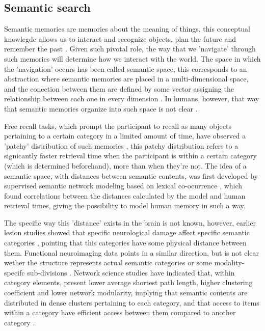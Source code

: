 \documentclass[11pt]{article}
\begin{document}
\subsection{Semantic search}
\label{sec:org3baebef}

Semantic memories are memories about the meaning of things, this conceptual
knowlegde allows us to interact and recognize objects, plan the future and
remember the past \citep{binderNeurobiologySemanticMemory2011}. Given such pivotal
role, the way that we 'navigate' through such memories will determine how we
interact with the world. The space in which the 'navigation' occurs has been
called semantic space, this corresponds to an abstraction where semantic
memories are placed in a multi-dimensional space, and the conection between them
are defined by some vector assigning the relationship between each one in every
dimension \citep{lundProducingHighdimensionalSemantic1996a}. In humans, however,
that way that semantic memories organize into such space is not clear
\citep{benedekHowSemanticMemory2017}.  

Free recall tasks, which prompt the participant to recall as many objects
pertaining to a certain category in a limited amount of time, have observed a
'patchy' distribution of such memories \citep{hillsOptimalForagingSemantic2009},
this patchy distribution refers to a signicantly faster retrieval time when the
participant is within a certain category (which is determined beforehand), more
than when they're not. The idea of a semantic space, with distances between
semantic contents, was first developed by supervised semantic network modeling based on lexical
co-ocurrence \citep{lundProducingHighdimensionalSemantic1996a}, which found
correlations between the distances calculated by the model and human retrieval
times, giving the possibility to model human memory in such a way.

The specific way this 'distance' exists in the brain is not known, however,
earlier lesion studies showed that specific neurological damage affect
specific semantic categories
\citep{hillisCATEGORYSPECIFICNAMINGCOMPREHENSION1991}, pointing that this
categories have some physical distance between them. Functional neuroimaging
data points in a similar direction, but is not clear wether the structure
represents actual semantic categories or some modality-specifc sub-divisions
\citep{caramazzaOrganizationConceptualKnowledge2003,binderWhereSemanticSystem2009}.
Network science studies have indicated that, within category elements, present
lower average shortest path length, higher clustering coefficient and lower
network modularity, implying that semantic contents are distributed in dense
clusters pertaining to each category, and that access to items within a category
have efficient access between them compared to another category
\citep{benedekHowSemanticMemory2017}.
\end{document}
